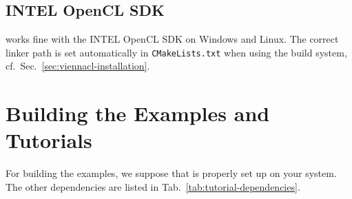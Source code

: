 
\subsection{INTEL OpenCL SDK} \label{sec:opencl-on-intel}
 {\ViennaCL} works fine with the INTEL OpenCL SDK on Windows and Linux.
The correct linker path is set automatically in \lstinline|CMakeLists.txt| when using the {\CMake} build system, cf.~Sec.~\ref{sec:viennacl-installation}.


\section{Building the Examples and Tutorials}
For building the examples, we suppose that {\CMake} is properly set up
on your system. The other dependencies are listed in Tab.~\ref{tab:tutorial-dependencies}.

